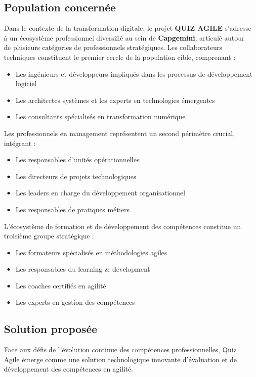 \documentclass[12pt,a4paper]{report}
\begin{document}
\subsection{Population concernée}

Dans le contexte de la transformation digitale, le projet \textbf{QUIZ AGILE} s'adresse à un écosystème professionnel diversifié au sein de \textbf{Capgemini}, articulé autour de plusieurs catégories de professionnels stratégiques. Les collaborateurs techniques constituent le premier cercle de la population cible, comprenant :

\begin{itemize}
\item Les ingénieurs et développeurs impliqués dans les processus de développement logiciel
\item Les architectes systèmes et les experts en technologies émergentes
\item Les consultants spécialisés en transformation numérique
\end{itemize}

Les professionnels en management représentent un second périmètre crucial, intégrant :
\begin{itemize}
\item Les responsables d'unités opérationnelles
\item Les directeurs de projets technologiques
\item Les leaders en charge du développement organisationnel
\item Les responsables de pratiques métiers
\end{itemize}

L'écosystème de formation et de développement des compétences constitue un troisième groupe stratégique :
\begin{itemize}
\item Les formateurs spécialisés en méthodologies agiles
\item Les responsables du learning \& development
\item Les coaches certifiés en agilité
\item Les experts en gestion des compétences
\end{itemize}

\subsection{Solution proposée}

Face aux défis de l'évolution continue des compétences professionnelles, Quiz Agile émerge comme une solution technologique innovante d'évaluation et de développement des compétences en agilité.
\end{document}
